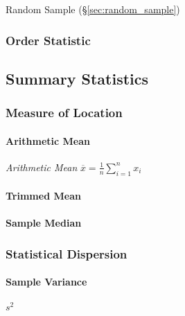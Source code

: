 Random Sample (\S\ref{sec:random_sample})



\subsubsection{Order Statistic}\label{sec:order_statistic}



\subsection{Summary Statistics}\label{sec:summary_statistics}

\subsubsection{Measure of Location}\label{sec:location_measure}

\paragraph{Arithmetic Mean}\label{sec:arithmetic_mean}\hfill

\emph{Arithmetic Mean} $\overline{x} = \frac{1}{n}\sum_{i=1}^n x_i$



\paragraph{Trimmed Mean}\label{sec:trimmed_mean}\hfill

\paragraph{Sample Median}\label{sec:median}\hfill



\subsubsection{Statistical Dispersion}\label{sec:statistical_dispersion}

\paragraph{Sample Variance}\label{sec:variability}\hfill

$s^2$

